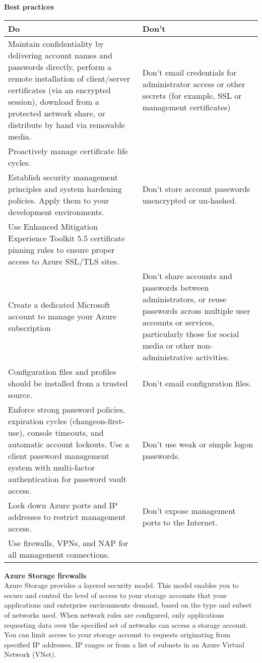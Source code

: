 \textbf{Best practices} \\
\begin{tabular}{p{7.3cm} p{7.3cm}}
\textbf{Do} & \textbf{Don't} \\
\hline 
Maintain confidentiality by delivering account names and passwords directly, perform a remote installation of client/server certificates (via an encrypted session), download from a protected network share, or distribute by hand via removable media. & Don't email credentials for administrator access or other secrets (for example, SSL or management certificates) \\
\hline 
Proactively manage certificate life cycles. &  \\
\hline 
Establish security management principles and system hardening policies. Apply them to your development environments. & Don't store account passwords unencrypted or un-hashed. \\
\hline 
Use Enhanced Mitigation Experience Toolkit 5.5 certificate pinning rules to ensure proper access to Azure SSL/TLS sites. &  \\
\hline 
Create a dedicated Microsoft account to manage your Azure subscription & Don't share accounts and passwords between administrators, or reuse passwords across multiple user accounts or services, particularly those for social media or other non-administrative activities. \\
\hline
Configuration files and profiles should be installed from a trusted source. & Don't email configuration files. \\
\hline
Enforce strong password policies, expiration cycles (changeon-first-use), console timeouts, and automatic account lockouts. Use a client password management system with multi-factor authentication for password vault access. & Don't use weak or simple logon passwords. \\
\hline
Lock down Azure ports and IP addresses to restrict management access. & Don't expose management ports to the Internet. \\
\hline
Use firewalls, VPNs, and NAP for all management connections.
\end{tabular}

\clearpage
\textbf{Azure Storage firewalls} \\
Azure Storage provides a layered security model. This model enables you to secure and control the level of access to your storage accounts that your applications and enterprise environments demand, based on the type and subset of networks used. When network rules are configured, only applications requesting data over the specified set of networks can access a storage account. You can limit access to your storage account to requests originating from specified IP addresses, IP ranges or from a list of subnets in an Azure Virtual Network (VNet).

